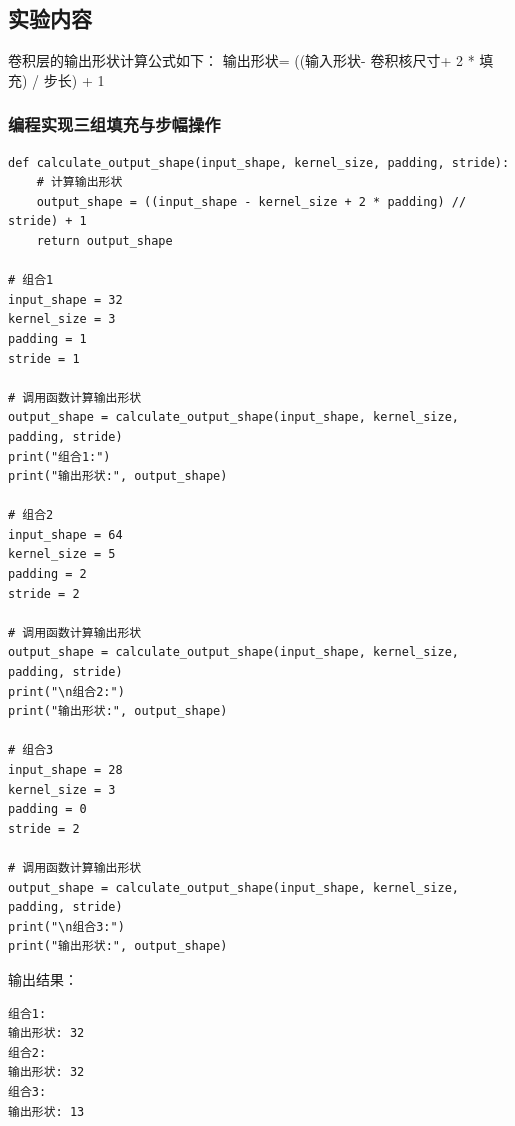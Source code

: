 \documentclass[a4paper,12pt]{article}
\begin{document}
\subsection{实验内容}
卷积层的输出形状计算公式如下：
输出形状= ((输入形状- 卷积核尺寸+ 2 * 填充) / 步长) + 1
\subsubsection{编程实现三组填充与步幅操作}
\begin{lstlisting}
def calculate_output_shape(input_shape, kernel_size, padding, stride):
    # 计算输出形状
    output_shape = ((input_shape - kernel_size + 2 * padding) // stride) + 1
    return output_shape

# 组合1
input_shape = 32
kernel_size = 3
padding = 1
stride = 1

# 调用函数计算输出形状
output_shape = calculate_output_shape(input_shape, kernel_size, padding, stride)
print("组合1:")
print("输出形状:", output_shape)

# 组合2
input_shape = 64
kernel_size = 5
padding = 2
stride = 2

# 调用函数计算输出形状
output_shape = calculate_output_shape(input_shape, kernel_size, padding, stride)
print("\n组合2:")
print("输出形状:", output_shape)

# 组合3
input_shape = 28
kernel_size = 3
padding = 0
stride = 2

# 调用函数计算输出形状
output_shape = calculate_output_shape(input_shape, kernel_size, padding, stride)
print("\n组合3:")
print("输出形状:", output_shape)
\end{lstlisting}
输出结果：
\begin{lstlisting}
组合1:
输出形状: 32
组合2:
输出形状: 32
组合3:
输出形状: 13
\end{lstlisting}
\end{document}
